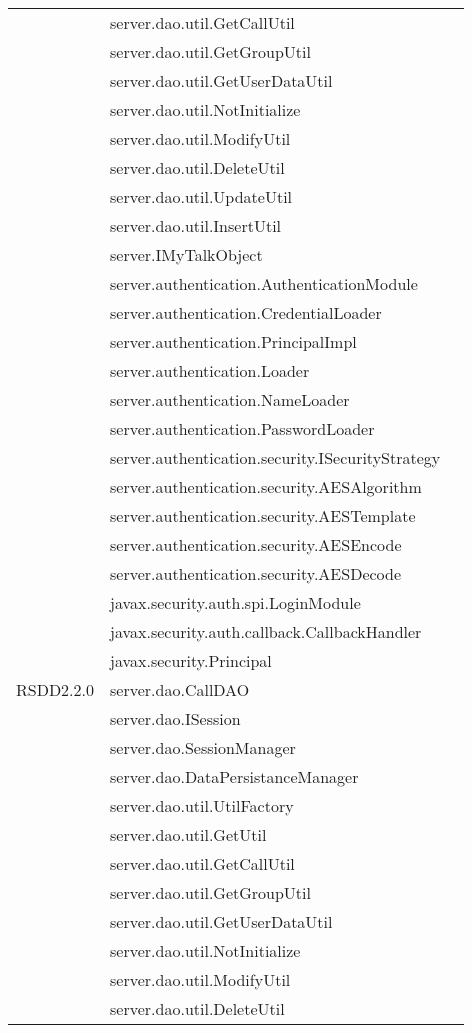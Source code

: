 \begin{center}
\begin{longtable}{lp{}l}
& server.dao.util.GetCallUtil\\
& server.dao.util.GetGroupUtil\\
& server.dao.util.GetUserDataUtil\\
& server.dao.util.NotInitialize\\
& server.dao.util.ModifyUtil\\
& server.dao.util.DeleteUtil\\
& server.dao.util.UpdateUtil\\
& server.dao.util.InsertUtil\\
& server.IMyTalkObject\\
& server.authentication.AuthenticationModule\\
& server.authentication.CredentialLoader\\
& server.authentication.PrincipalImpl\\
& server.authentication.Loader\\
& server.authentication.NameLoader\\
& server.authentication.PasswordLoader\\
& server.authentication.security.ISecurityStrategy\\
& server.authentication.security.AESAlgorithm\\
& server.authentication.security.AESTemplate\\
& server.authentication.security.AESEncode\\
& server.authentication.security.AESDecode\\
& javax.security.auth.spi.LoginModule\\
& javax.security.auth.callback.CallbackHandler\\
& javax.security.Principal\\
RSDD2.2.0 & server.dao.CallDAO\\
& server.dao.ISession\\
& server.dao.SessionManager\\
& server.dao.DataPersistanceManager\\
& server.dao.util.UtilFactory\\
& server.dao.util.GetUtil\\
& server.dao.util.GetCallUtil\\
& server.dao.util.GetGroupUtil\\
& server.dao.util.GetUserDataUtil\\
& server.dao.util.NotInitialize\\
& server.dao.util.ModifyUtil\\
& server.dao.util.DeleteUtil\\

\end{longtable}
\end{center}
